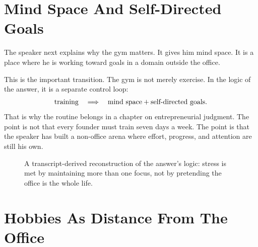 \section{Mind Space And Self-Directed Goals}

The speaker next explains why the gym matters. It gives him mind space. It is a place where he is working toward goals in a domain outside the office.

This is the important transition. The gym is not merely exercise. In the logic of the answer, it is a separate control loop:
\begin{equation}
\hbox{training}
\quad \Longrightarrow \quad
\hbox{mind space}+\hbox{self-directed goals}.
\end{equation}
That is why the routine belongs in a chapter on entrepreneurial judgment. The point is not that every founder must train seven days a week. The point is that the speaker has built a non-office arena where effort, progress, and attention are still his own.

\begin{figure}
\centering
{}
\caption{A transcript-derived reconstruction of the answer's logic: stress is met by maintaining more than one focus, not by pretending the office is the whole life.}
\end{figure}

\section{Hobbies As Distance From The Office}

